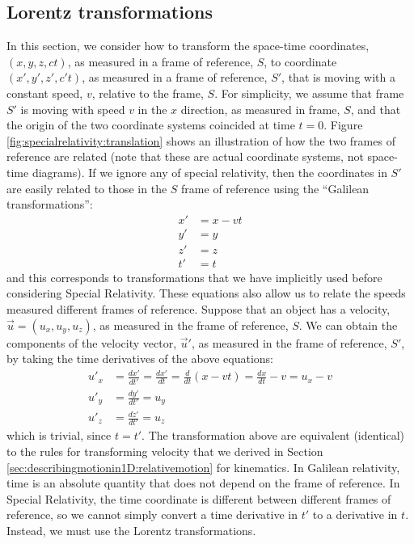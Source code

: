 \subsection{Lorentz transformations}
In this section, we consider how to transform the space-time coordinates, $(x,y,z,ct)$, as measured in a frame of reference, $S$, to coordinate $(x',y',z',c't)$, as measured in a frame of reference, $S'$, that is moving with a constant speed, $v$, relative to the frame, $S$. For simplicity, we assume that frame $S'$ is moving with speed $v$ in the $x$ direction, as measured in frame, $S$, and that the origin of the two coordinate systems coincided at time $t=0$. Figure \ref{fig:specialrelativity:translation} shows an illustration of how the two frames of reference are related (note that these are actual coordinate systems, not space-time diagrams).
If we ignore any of special relativity, then the coordinates in $S'$ are easily related to those in the $S$ frame of reference using the ``Galilean transformations'':
\begin{align*}
x' &= x - vt\\
y' &= y\\
z' &= z\\
t' &= t
\end{align*}
and this corresponds to transformations that we have implicitly used before considering Special Relativity. These equations also allow us to relate the speeds measured different frames of reference. Suppose that an object has a velocity, $\vec u=(u_x,u_y,u_z)$, as measured in the frame of reference, $S$. We can obtain the components of the velocity vector, $\vec u'$, as measured in the frame of reference, $S'$, by taking the time derivatives of the above equations:
\begin{align*}
u'_x &= \frac{dx'}{dt'}=\frac{dx'}{dt}=\frac{d}{dt}(x-vt)=\frac{dx}{dt}-v=u_x - v\\
u'_y &=\frac{dy'}{dt'}=u_y\\
u'_z &=\frac{dz'}{dt'}=u_z
\end{align*}
which is trivial, since $t=t'$. The transformation above are equivalent (identical) to the rules for transforming velocity that we derived in Section \ref{sec:describingmotionin1D:relativemotion} for kinematics. In Galilean relativity, time is an absolute quantity that does not depend on the frame of reference. In Special Relativity, the time coordinate is different between different frames of reference, so we cannot simply convert a time derivative in $t'$ to a derivative in $t$. Instead, we must use the Lorentz transformations.

